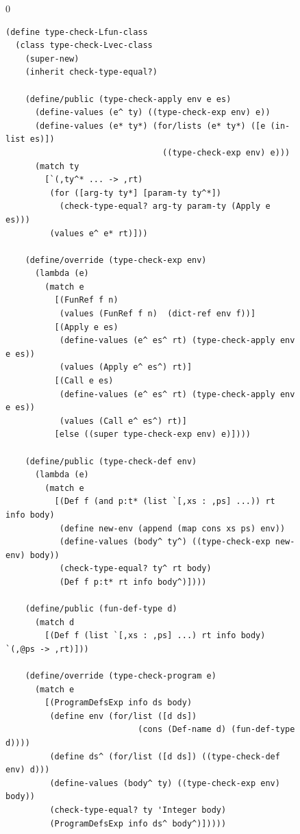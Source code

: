 \documentclass[7x10]{TimesAPriori_MIT}%
\def\racketEd{0}
\providecommand{\BookEdition}{1}
\let\edition\BookEdition
\numberwithin{theorem}{chapter}
\numberwithin{definition}{chapter}
\numberwithin{equation}{chapter}
\begin{document}
\begin{figure}[tp]
  \begin{tcolorbox}[colback=white]
    {\if\edition\racketEd  
\begin{lstlisting}[basicstyle=\ttfamily\footnotesize]
(define type-check-Lfun-class
  (class type-check-Lvec-class
    (super-new)
    (inherit check-type-equal?)

    (define/public (type-check-apply env e es)
      (define-values (e^ ty) ((type-check-exp env) e))
      (define-values (e* ty*) (for/lists (e* ty*) ([e (in-list es)])
                                ((type-check-exp env) e)))
      (match ty
        [`(,ty^* ... -> ,rt)
         (for ([arg-ty ty*] [param-ty ty^*])
           (check-type-equal? arg-ty param-ty (Apply e es)))
         (values e^ e* rt)]))

    (define/override (type-check-exp env)
      (lambda (e)
        (match e
          [(FunRef f n)
           (values (FunRef f n)  (dict-ref env f))]
          [(Apply e es)
           (define-values (e^ es^ rt) (type-check-apply env e es))
           (values (Apply e^ es^) rt)]
          [(Call e es)
           (define-values (e^ es^ rt) (type-check-apply env e es))
           (values (Call e^ es^) rt)]
          [else ((super type-check-exp env) e)])))

    (define/public (type-check-def env)
      (lambda (e)
        (match e
          [(Def f (and p:t* (list `[,xs : ,ps] ...)) rt info body)
           (define new-env (append (map cons xs ps) env))
           (define-values (body^ ty^) ((type-check-exp new-env) body))
           (check-type-equal? ty^ rt body)
           (Def f p:t* rt info body^)])))	 

    (define/public (fun-def-type d)
      (match d
        [(Def f (list `[,xs : ,ps] ...) rt info body)  `(,@ps -> ,rt)]))

    (define/override (type-check-program e)
      (match e
        [(ProgramDefsExp info ds body)
         (define env (for/list ([d ds])
                           (cons (Def-name d) (fun-def-type d))))
         (define ds^ (for/list ([d ds]) ((type-check-def env) d)))
         (define-values (body^ ty) ((type-check-exp env) body))
         (check-type-equal? ty 'Integer body)
         (ProgramDefsExp info ds^ body^)]))))


\end{lstlisting}}
\end{tcolorbox}
\end{figure}
\end{document}
